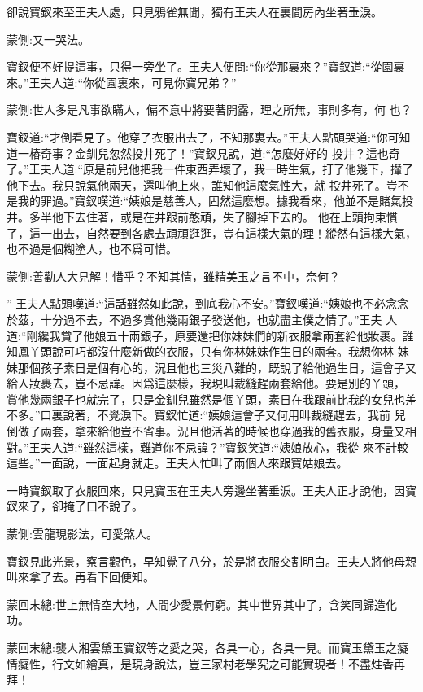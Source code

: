 \begin{parag}
    卻說寶釵來至王夫人處，只見鴉雀無聞，獨有王夫人在裏間房內坐著垂淚。\begin{note}蒙側:又一哭法。\end{note}寶釵便不好提這事，只得一旁坐了。王夫人便問:“你從那裏來？”寶釵道:“從園裏來。”王夫人道:“你從園裏來，可見你寶兄弟？”\begin{note}蒙側:世人多是凡事欲瞞人，偏不意中將要著開露，理之所無，事則多有，何 也？\end{note}寶釵道:“才倒看見了。他穿了衣服出去了，不知那裏去。”王夫人點頭哭道:“你可知道一樁奇事？金釧兒忽然投井死了！”寶釵見說，道:“怎麼好好的 投井？這也奇了。”王夫人道:“原是前兒他把我一件東西弄壞了，我一時生氣，打了他幾下，攆了他下去。我只說氣他兩天，還叫他上來，誰知他這麼氣性大，就 投井死了。豈不是我的罪過。”寶釵嘆道:“姨娘是慈善人，固然這麼想。據我看來，他並不是賭氣投井。多半他下去住著，或是在井跟前憨頑，失了腳掉下去的。 他在上頭拘束慣了，這一出去，自然要到各處去頑頑逛逛，豈有這樣大氣的理！縱然有這樣大氣，也不過是個糊塗人，也不爲可惜。\begin{note}蒙側:善勸人大見解！惜乎？不知其情，雖精美玉之言不中，奈何？\end{note}” 王夫人點頭嘆道:“這話雖然如此說，到底我心不安。”寶釵嘆道:“姨娘也不必念念於茲，十分過不去，不過多賞他幾兩銀子發送他，也就盡主僕之情了。”王夫 人道:“剛纔我賞了他娘五十兩銀子，原要還把你妹妹們的新衣服拿兩套給他妝裹。誰知鳳丫頭說可巧都沒什麼新做的衣服，只有你林妹妹作生日的兩套。我想你林 妹妹那個孩子素日是個有心的，況且他也三災八難的，既說了給他過生日，這會子又給人妝裹去，豈不忌諱。因爲這麼樣，我現叫裁縫趕兩套給他。要是別的丫頭， 賞他幾兩銀子也就完了，只是金釧兒雖然是個丫頭，素日在我跟前比我的女兒也差不多。”口裏說著，不覺淚下。寶釵忙道:“姨娘這會子又何用叫裁縫趕去，我前 兒倒做了兩套，拿來給他豈不省事。況且他活著的時候也穿過我的舊衣服，身量又相對。”王夫人道:“雖然這樣，難道你不忌諱？”寶釵笑道:“姨娘放心，我從 來不計較這些。”一面說，一面起身就走。王夫人忙叫了兩個人來跟寶姑娘去。
\end{parag}


\begin{parag}
    一時寶釵取了衣服回來，只見寶玉在王夫人旁邊坐著垂淚。王夫人正才說他，因寶釵來了，卻掩了口不說了。\begin{note}蒙側:雲龍現影法，可愛煞人。\end{note}寶釵見此光景，察言觀色，早知覺了八分，於是將衣服交割明白。王夫人將他母親叫來拿了去。再看下回便知。
\end{parag}


\begin{parag}
    \begin{note}蒙回末總:世上無情空大地，人間少愛景何窮。其中世界其中了，含笑同歸造化功。\end{note}
\end{parag}


\begin{parag}
    \begin{note}蒙回末總:襲人湘雲黛玉寶釵等之愛之哭，各具一心，各具一見。而寶玉黛玉之癡情癡性，行文如繪真，是現身說法，豈三家村老學究之可能實現者！不盡炷香再拜！\end{note}
\end{parag}

